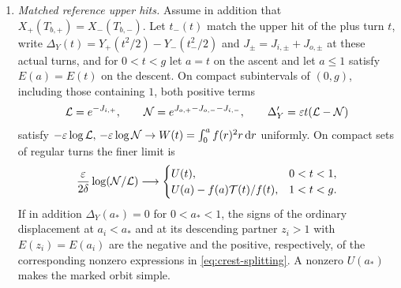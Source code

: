 \begin{lemma}
\begin{enumerate}
  crest $r_{\mathrm{crest},\sigma}$ and from $T_{b,\sigma}$, the minimum is
  attained at $S=T$ and equals
  $\int_{r_{\mathrm{crest},\sigma}}^{\sqrt{2T}}(\partial_r p_\sigma)^2\dd r/r$.
  \item[\textup{(ii)}] \emph{Matched reference upper hits.} Assume in addition
  that $X_+(T_{b,+})=X_-(T_{b,-})$. Let $t_-(t)$ match the upper hit of the
  plus turn $t$, write $\Delta_Y(t)=Y_+(t^2/2)-Y_-(t_-^2/2)$ and
  $J_\pm=J_{i,\pm}+J_{o,\pm}$ at these actual turns, and for $0<t<g$ let $a=t$
  on the ascent and let $a\le 1$ satisfy $E(a)=E(t)$ on the descent. On compact
  subintervals of $(0,g)$, including those containing $1$, both positive terms
  \[
   \mathcal L=e^{-J_{i,+}},\qquad \mathcal N=e^{J_{o,+}-J_{o,-}-J_{i,-}},\qquad
   \Delta_Y'=\varepsilon t(\mathcal L-\mathcal N)
  \]
  satisfy $-\varepsilon\log \mathcal L,\,-\varepsilon\log \mathcal N\to W(t)=\int_0^a f(r)^2r\,\mathrm{d} r$
  uniformly. On compact sets of regular turns the finer limit is
  \begin{equation}\label{eq:crest-splitting}
   \frac{\varepsilon}{2\delta}\log(\mathcal N/\mathcal L)\longrightarrow
   \begin{cases}U(t),&0<t<1,\\
   U(a)-f(a)\mathcal{T}(t)/f(t),&1<t<g .
   \end{cases}
  \end{equation}
  If in addition $\Delta_Y(a_*)=0$ for $0<a_*<1$, the signs of the ordinary
  displacement at $a_i<a_*$ and at its descending partner
  $z_i>1$ with $E(z_i)=E(a_i)$ are the negative and the positive,
  respectively, of the corresponding nonzero expressions in
  \eqref{eq:crest-splitting}. A nonzero $U(a_*)$ makes the marked orbit simple.
\end{enumerate}
\end{lemma}

